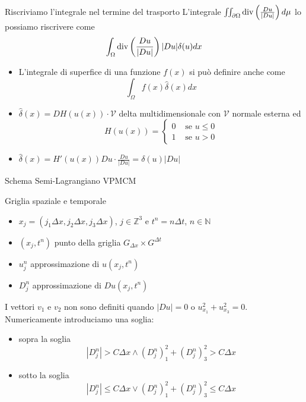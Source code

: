 \begin{frame}{Riscriviamo l'integrale nel termine del trasporto}
     L'integrale
    $\iint_{\partial\Omega}\operatorname{div}\left(\frac{Du}{|Du|}\right)d\mu$ lo
    possiamo riscrivere come
    \[
    \int_{\Omega}\operatorname{div}\left(\frac{Du}{|Du|}\right)|Du|\delta(u)dx
    \]
    \begin{itemize}
    \item L'integrale di superfice di una funzione $f(x)$ si può
      definire anche come 
      \[
      \int_{\Omega}f(x)\hat{\delta}(x)dx
      \]   
    \item $\hat{\delta}(x)=DH(u(x))\cdot\mathcal{V}$ delta
      multidimensionale con $\mathcal{V}$ normale esterna ed 
      \[
      H(u(x))=
      \begin{cases}
        0 &\text{ se }u\leq 0 \\
        1 &\text{ se }u > 0
      \end{cases}
      \]
    \item $\hat{\delta}(x)=H'(u(x))Du\cdot\frac{Du}{|Du|}=\delta(u)|Du|$
    \end{itemize}
 \end{frame}

\begin{frame}{Schema Semi-Lagrangiano VPMCM}
  \begin{block}{Griglia spaziale e temporale}
    \begin{itemize}
      \item $x_j=(j_1\Delta x,j_2\Delta x,j_3\Delta x)$,
        $j\in\mathbb{Z}^3$ e $t^n=n\Delta t$, $n\in\mathbb{N}$
      \item $(x_j,t^n)$ punto della griglia $G_{\Delta x}\times
        G^{\Delta t}$
      \item $u_j^n$ approssimazione di $u(x_j,t^n)$
      \item $D_j^n$ approssimazione di $Du(x_j,t^n)$
    \end{itemize}
    \end{block}
  \begin{osservazione}
    I vettori $v_1$ e $v_2$ non sono definiti quando $|Du|=0$ o
    $u_{x_1}^2+u_{x_3}^2=0$. Numericamente introduciamo una soglia:
    \begin{itemize}
    \item \alert{sopra la soglia}
      \[
      |D_j^n|>C\Delta x \land (D_j^n)_1^2+(D_j^n)_3^2>C\Delta x
      \]
    \item \alert{sotto la soglia}
      \[
      |D_j^n|\leq C\Delta x \lor (D_j^n)_1^2+(D_j^n)_3^2\leq C\Delta x
      \]
      \end{itemize}
    \end{osservazione}
\end{frame}

